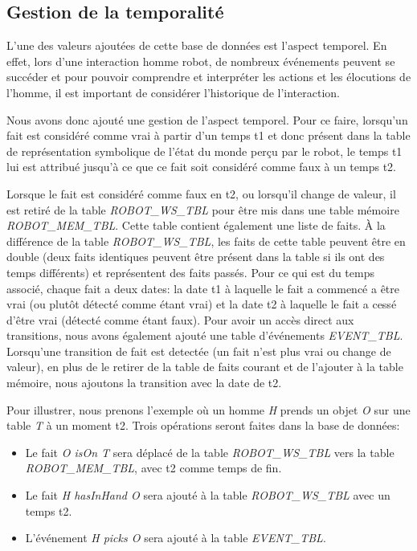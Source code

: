 \documentclass[a4paper,11pt,twoside]{StyleThese}
\begin{document}
\subsection{Gestion de la temporalité}
\label{sec:dbt}
L'une des valeurs ajoutées de cette base de données est l'aspect temporel.
En effet, lors d'une interaction homme robot, de nombreux événements peuvent se succéder et pour pouvoir comprendre et interpréter les actions et les élocutions de l'homme, il est important de considérer l'historique de l'interaction.

Nous avons donc ajouté une gestion de l'aspect temporel.
Pour ce faire, lorsqu'un fait est considéré comme vrai à partir d'un temps t1 et donc présent dans la table de représentation symbolique de l'état du monde perçu par le robot, le temps t1 lui est attribué jusqu'à ce que ce fait soit considéré comme faux à un temps t2.

Lorsque le fait est considéré comme faux en t2, ou lorsqu'il change de valeur, il est retiré de la table \textit{ROBOT\_WS\_TBL} pour être mis dans une table mémoire \textit{ROBOT\_MEM\_TBL}. Cette table contient également une liste de faits. À la différence de la table \textit{ROBOT\_WS\_TBL}, les faits de cette table peuvent être en double (deux faits identiques peuvent être présent dans la table si ils ont des temps différents) et représentent des faits passés. Pour ce qui est du temps associé, chaque fait a deux dates: la date t1 à laquelle le fait a commencé a être vrai (ou plutôt détecté comme étant vrai) et la date t2 à laquelle le fait a cessé d'être vrai (détecté comme étant faux).
Pour avoir un accès direct aux transitions, nous avons également ajouté une table d'événements \textit{EVENT\_TBL}. Lorsqu'une transition de fait est detectée (un fait n'est plus vrai ou change de valeur), en plus de le retirer de la table de faits courant et de l'ajouter à la table mémoire, nous ajoutons la transition avec la date de t2. 

Pour illustrer, nous prenons l'exemple où un homme \textit{H} prends un objet \textit{O} sur une table \textit{T} à un moment t2. Trois opérations seront faites dans la base de données:

\begin{itemize}
\item Le fait \textit{O isOn T} sera déplacé de la table \textit{ROBOT\_WS\_TBL} vers la table \textit{ROBOT\_MEM\_TBL}, avec t2 comme temps de fin.
\item Le fait  \textit{H hasInHand O} sera ajouté à la table \textit{ROBOT\_WS\_TBL} avec un temps t2.
\item L'événement \textit{H picks O} sera ajouté à la table \textit{EVENT\_TBL}.
\end{itemize}
\end{document}
